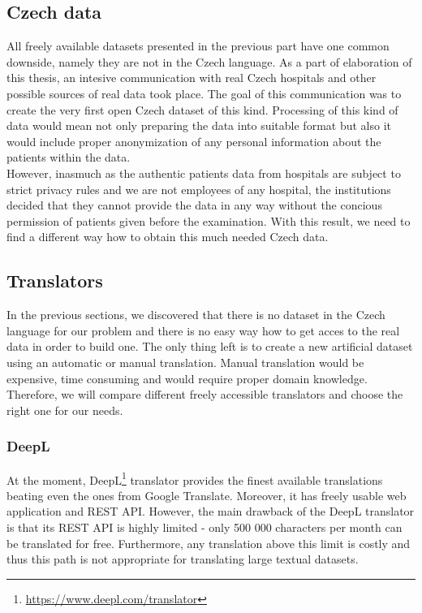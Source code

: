 \subsection{Czech data}
\label{sec:CzechData}
All freely available datasets presented in the previous part have one common downside, namely they are not in the Czech language. As a part of elaboration of this thesis, an intesive communication with real Czech hospitals and other possible sources of real data took place. The goal of this communication was to create the very first open Czech dataset of this kind. Processing of this kind of data would mean not only preparing the data into suitable format but also it would include proper anonymization of any personal information about the patients within the data. \\

However, inasmuch as the authentic patients data from hospitals are subject to strict privacy rules and we are not employees of any hospital, the institutions decided that they cannot provide the data in any way without the concious permission of patients given before the examination. With this result, we need to find a different way how to obtain this much needed Czech data.

\subsection{Translators}
\label{sec:Translators}
In the previous sections, we discovered that there is no dataset in the Czech language for our problem and there is no easy way how to get acces to the real data in order to build one. The only thing left is to create a new artificial dataset using an automatic or manual translation. Manual translation would be expensive, time consuming and would require proper domain knowledge. Therefore, we will compare different freely accessible translators and choose the right one for our needs.

\subsubsection{DeepL}
At the moment, DeepL\footnote[11]{\url{https://www.deepl.com/translator}} translator provides the finest available translations beating even the ones from Google Translate. Moreover, it has freely usable web application and REST API. However, the main drawback of the DeepL translator is that its REST API is highly limited - only 500 000 characters per month can be translated for free. Furthermore, any translation above this limit is costly and thus this path is not appropriate for translating large textual datasets.

